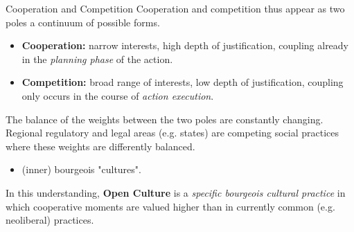 \documentclass{beamer}
\begin{document}
\begin{frame}{Cooperation and Competition}
Cooperation and competition thus appear as two poles a continuum of possible
forms.\vspace{-1em}
\begin{itemize}
\item \textbf{Cooperation:} narrow interests, high depth of justification,
  coupling already in the \emph{planning phase} of the action.
\item \textbf{Competition:} broad range of interests, low depth of
  justification, coupling only occurs in the course of \emph{action
    execution}.
\end{itemize}\vspace{-1em}
The balance of the weights between the two poles are constantly changing.
Regional regulatory and legal areas (e.g. states) are competing social
practices where these weights are differently balanced.\vspace{-1em}

\begin{itemize}
\item (inner) bourgeois "cultures".
\end{itemize}\vspace{-1em}
In this understanding, \textbf{Open Culture} is a \emph{specific bourgeois
  cultural practice} in which cooperative moments are valued higher than in
currently common (e.g. neoliberal) practices.
\end{frame}
\end{document}
